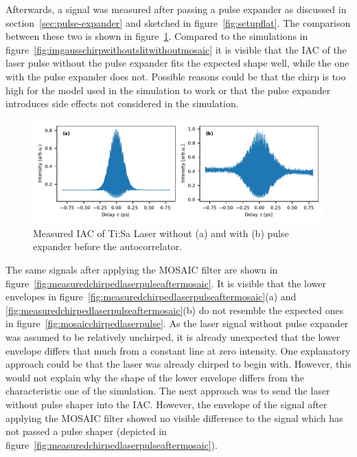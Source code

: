 Afterwards, a signal was measured after passing a pulse expander as discussed in section~\ref{sec:pulse-expander} and sketched in figure~\ref{fig:setupflat}.
The comparison between these two is shown in figure~\ref{fig:measuredchirpedlaserpulsebeforemosaic}.
Compared to the simulations in figure~\ref{fig:imgausschirpwithoutslitwithoutmosaic} it is visible that the \ac{IAC} of the laser pulse without the pulse expander fits the expected shape well, while the one with the pulse expander does not.
Possible reasons could be that the chirp is too high for the model used in the simulation to work or that the pulse expander introduces side effects not considered in the simulation.

\begin{figure}[H]
	\centering
	\includegraphics[width=\linewidth]{figures/chirp/plots/measured_chirped_laser_pulse_before_MOSAIC}
	\caption{Measured IAC of Ti:Sa Laser without (a) and with (b) pulse expander before the autocorrelator.}
	\label{fig:measuredchirpedlaserpulsebeforemosaic}
\end{figure}

The same signals after applying the \ac{MOSAIC} filter are shown in figure~\ref{fig:measuredchirpedlaserpulseaftermosaic}.
It is visible that the lower envelopes in figure~\ref{fig:measuredchirpedlaserpulseaftermosaic}(a) and \ref{fig:measuredchirpedlaserpulseaftermosaic}(b) do not resemble the expected ones in figure~\ref{fig:mosaicchirpedlaserpulse}.
As the laser signal without pulse expander was assumed to be relatively unchirped, it is already unexpected that the lower envelope differs that much from a constant line at zero intensity.
One explanatory approach could be that the laser was already chirped to begin with. However, this would not explain why the shape of the lower envelope differs from the characteristic one of the simulation.
The next approach was to send the laser without pulse shaper into the \ac{IAC}.
However, the envelope of the signal after applying the \ac{MOSAIC} filter showed no visible difference to the signal which has not passed a pulse shaper (depicted in figure~\ref{fig:measuredchirpedlaserpulseaftermosaic}).

